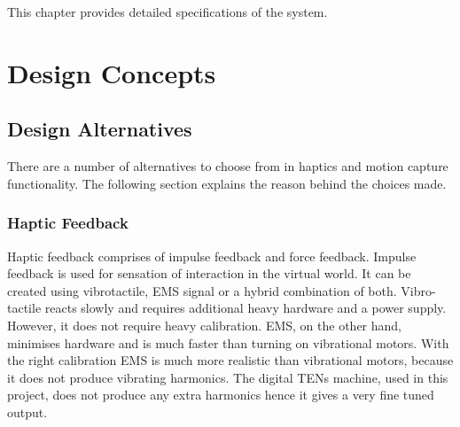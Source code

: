 This chapter provides detailed specifications of the system.




\section{Design Concepts}

\subsection{Design Alternatives}

There are a number of alternatives to choose from in haptics and motion capture functionality. The following section explains the reason behind the choices made. 

\subsubsection{Haptic Feedback}

Haptic feedback comprises of impulse feedback and force feedback. Impulse feedback is used for sensation of interaction in the virtual world. It can be created using vibrotactile, EMS signal or a hybrid combination of both. Vibro-tactile reacts slowly and requires additional heavy hardware and a power supply. However, it does not require heavy calibration. EMS, on the other hand, minimises hardware and is much faster than turning on vibrational motors. With the right calibration EMS is much more realistic than vibrational motors, because it does not produce vibrating harmonics. The digital TENs machine, used in this project, does not produce any extra harmonics hence it gives a very fine tuned output. 

